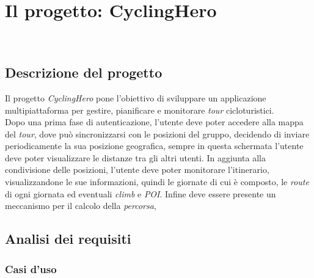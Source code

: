 
\chapter{Il progetto: CyclingHero}
\label{cap:cap3}

\\

\section{Descrizione del progetto}
Il progetto \textit{CyclingHero} pone l'obiettivo di sviluppare un applicazione multipiattaforma per gestire, pianificare e monitorare \textit{tour} cicloturistici.\\
Dopo una prima fase di autenticazione, l'utente deve poter accedere alla mappa del \textit{tour}, dove può sincronizzarsi con le posizioni del gruppo, decidendo di inviare periodicamente la sua posizione geografica, sempre in questa schermata l'utente deve poter visualizzare le distanze tra gli altri utenti. In aggiunta alla condivisione delle posizioni, l'utente deve poter monitorare l'itinerario, visualizzandone le sue informazioni, quindi le giornate di cui è composto, le \textit{route} di ogni giornata ed eventuali \textit{climb} e \textit{POI}. Infine deve essere presente un meccanismo per il calcolo della \textit{percorsa}, 

\section{Analisi dei requisiti}
\subsection{Casi d'uso}
